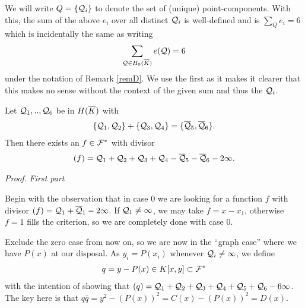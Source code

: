 \documentclass[english,11pt,a4paper]{article}
\begin{document}
We will write $Q = \{ \mathcal{Q}_i \}$ to denote the set of (unique) point-components. With this, the sum of the above $e_i$ over all distinct $\mathcal{Q}_i$ is well-defined and is $\sum_Q e_i = 6$ which is incidentally the same as writing 
\begin{align*}
  \sum_{\mathcal{Q} \in H_0(\overline K)} e(\mathcal{Q}) = 6
\end{align*}
under the notation of Remark \ref{remD}. We use the first as it makes it clearer that this makes no sense without the context of the given sum and thus the $\mathcal{Q}_i$.



\begin{theorem}\label{hhs}
  Let $\mathcal{Q}_1,..,\mathcal{Q}_6$ be in $H(\overline K)$ with %
  \begin{align*}
    \{ \mathcal{Q}_1 , \mathcal{Q}_2\}+\{\mathcal{Q}_3 , \mathcal{Q}_4\} = \{\overline {\mathcal{Q}}_5 , \overline {\mathcal{Q}}_6 \}.
  \end{align*}
  Then there exists an $f \in \mathcal{F}^*$ with divisor
  \begin{align*}
    (f) = \mathcal{Q}_1 + \mathcal{Q}_2 + \mathcal{Q}_3 + \mathcal{Q}_4 - \overline {\mathcal{Q}}_5 - \overline {\mathcal{Q}}_6 - 2 \infty.
  \end{align*}
\end{theorem}

\newpage

\emph{Proof.} \textit{First part}

Begin with the observation that in case 0 we are looking for a function $f$ with divisor $(f) = \mathcal{Q}_1 + \overline {\mathcal{Q}}_1 - 2 \infty$. If $\mathcal{Q}_1 \neq \infty$, we may take $f = x-x_1$, otherwise $f = 1$ fills the criterion, so we are completely done with case 0.

Exclude the zero case from now on, so we are now in the ``graph case'' where we have $P(x)$ at our disposal. As $y_i = P(x_i)$ whenever $\mathcal{Q}_i \neq \infty$, we define
\begin{align*}
  q = y -P(x) \in K[x,y] \subset \mathcal{F}^*
\end{align*}
with the intention of showing that $(q) = \mathcal{Q}_1 + \mathcal{Q}_2 + \mathcal{Q}_3 + \mathcal{Q}_4 + \mathcal{Q}_5 + \mathcal{Q}_6 - 6 \infty$. The key here is that $q \bar q = y^2 -(P(x))^2 = C(x) -(P(x))^2 = D(x)$.
\end{document}
